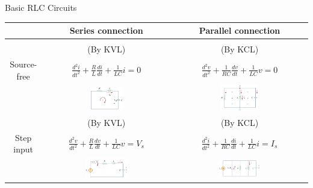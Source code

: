 \documentclass{beamer}
\begin{document}
\begin{frame}{Basic RLC Circuits}

\begin{table}[]
    \centering
    \begin{tabular}{c|cc}
    \toprule
         &Series connection& Parallel connection  \\
    \hline
    &&\\
    &(By KVL)&(By KCL)\\
         Source-free& $\frac{d^2i}{dt^2}+\frac{R}{L}\frac{di}{dt}+\frac{1}{LC}i=0$ & $\frac{d^2v}{dt^2}+\frac{1}{RC}\frac{dv}{dt}+\frac{1}{LC}v=0$\\
         &
        \includegraphics[width=0.27\textwidth]{img_2order/4_sourcefreeseries.png}
         &
         \includegraphics[width=0.3\textwidth]{img_2order/5_sourcefreeparallel.png}
         \\
          &(By KVL)&(By KCL)\\
        Step input& $\frac{d^2v}{dt^2}+\frac{R}{L}\frac{dv}{dt}+\frac{1}{LC}v=V_s$ & $\frac{d^2i}{dt^2}+\frac{1}{RC}\frac{di}{dt}+\frac{1}{LC}i=I_s$\\
          &
         \includegraphics[width=0.35\textwidth]{img_2order/6_stepresponseseries.png}
         &
         \includegraphics[width=0.32\textwidth]{img_2order/7_stepresponseparallel.png}
         \\
         \bottomrule
    \end{tabular}
\end{table}
    
\end{frame}
\end{document}
